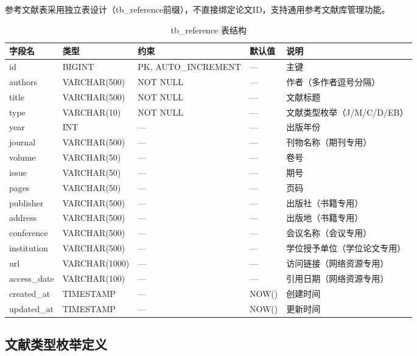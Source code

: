 \documentclass{../softeng}
\begin{document}
参考文献表采用独立表设计（tb\_reference前缀），不直接绑定论文ID，支持通用参考文献库管理功能。

\begin{table}[htbp]
\centering
\caption{tb\_reference 表结构}
\label{tab:tb_reference}
\begin{tabular}{lllll}
\toprule
\textbf{字段名} & \textbf{类型} & \textbf{约束} & \textbf{默认值} & \textbf{说明} \\
\midrule
id          & BIGINT    & PK, AUTO\_INCREMENT & —      & 主键 \\
authors     & VARCHAR(500) & NOT NULL        & —      & 作者（多作者逗号分隔）\\
title       & VARCHAR(500) & NOT NULL        & —      & 文献标题 \\
type        & VARCHAR(10)  & NOT NULL        & —      & 文献类型枚举（J/M/C/D/EB）\\
year        & INT       & —                & —      & 出版年份 \\
journal     & VARCHAR(500) & —                & —      & 刊物名称（期刊专用）\\
volume      & VARCHAR(50)  & —                & —      & 卷号 \\
issue       & VARCHAR(50)  & —                & —      & 期号 \\
pages       & VARCHAR(50)  & —                & —      & 页码 \\
publisher   & VARCHAR(500) & —                & —      & 出版社（书籍专用）\\
address     & VARCHAR(500) & —                & —      & 出版地（书籍专用）\\
conference  & VARCHAR(500) & —                & —      & 会议名称（会议专用）\\
institution & VARCHAR(500) & —                & —      & 学位授予单位（学位论文专用）\\
url         & VARCHAR(1000)& —                & —      & 访问链接（网络资源专用）\\
access\_date & VARCHAR(100) & —                & —      & 引用日期（网络资源专用）\\
created\_at  & TIMESTAMP  & —                & NOW()  & 创建时间 \\
updated\_at  & TIMESTAMP  & —                & NOW()  & 更新时间 \\
\bottomrule
\end{tabular}
\end{table}

\subsection{文献类型枚举定义}
\end{document}
